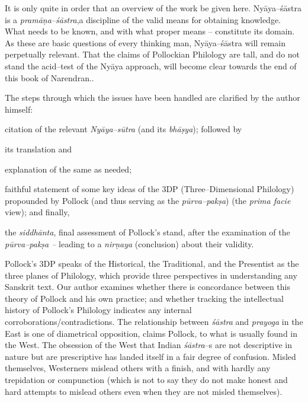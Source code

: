 It is only quite in order that an overview of the work be given here. Nyāya–śāstra is a \textit{pramāṇa–śāstra},a discipline of the valid means for obtaining knowledge. What needs to be known, and with what proper means – constitute its domain. As these are basic questions of every thinking man, Nyāya–śāstra will remain perpetually relevant. That the claims of Pollockian Philology are tall, and do not stand the acid–test of the Nyāya approach, will become clear towards the end of this book of Narendran..

The steps through which the issues have been handled are clarified by the author himself:

\item citation of the relevant \textit{Nyāya–sūtra} (and its \textit{bhāṣya}); followed by

 \item its translation and

 \item explanation of the same as needed;

 \item faithful statement of some key ideas of the 3DP (Three–Dimensional Philology) propounded by Pollock (and thus serving as the \textit{pūrva–pakṣa}) (the \textit{prima facie} view); and finally,

 \item the \textit{siddhānta}, final assessment of Pollock’s stand, after the examination of the \textit{pūrva–pakṣa –} leading to a \textit{nirṇaya} (conclusion) about their validity.

Pollock’s 3DP speaks of the Historical, the Traditional, and the Presentist as the three planes of Philology, which provide three perspectives in understanding any Sanskrit text. Our author examines whether there is concordance between this theory of Pollock and his own practice; and whether tracking the intellectual history of Pollock’s Philology indicates any internal corroborations/contradictions. The relationship between \textit{śāstra} and \textit{prayoga} in the East is one of diametrical opposition, claims Pollock, to what is usually found in the West. The obsession of the West that Indian \textit{śāstra}–s are not descriptive in nature but are prescriptive has landed itself in a fair degree of confusion. Misled themselves, Westerners mislead others with a finish, and with hardly any trepidation or compunction (which is not to say they do not make honest and hard attempts to mislead others even when they are not misled themselves).

